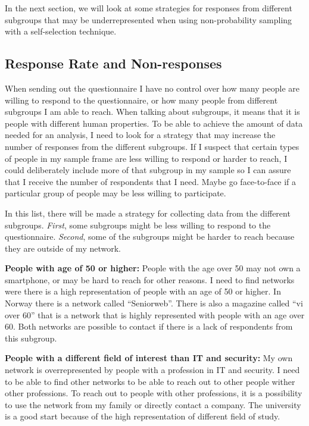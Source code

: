     In the next section, we will look at some strategies for responses from different subgroups that may be underrepresented when using non-probability sampling with a self-selection technique. 

    \subsection{Response Rate and Non-responses} \label{sec:response}

    When sending out the questionnaire I have no control over how many people are willing to respond to the questionnaire, or how many people from different subgroups I am able to reach. When talking about subgroups, it means that it is people with different human properties. To be able to achieve the amount of data needed for an analysis, I need to look for a strategy that may increase the number of responses from the different subgroups. If I suspect that certain types of people in my sample frame are less willing to respond or harder to reach, I could deliberately include more of that subgroup in my sample so I can assure that I receive the number of respondents that I need. Maybe go face-to-face if a particular group of people may be less willing to participate. 

    In this list, there will be made a strategy for collecting data from the different subgroups. {\it First}, some subgroups might be less willing to respond to the questionnaire. {\it Second}, some of the subgroups might be harder to reach because they are outside of my network. 

    {\bf People with age of 50 or higher:} People with the age over 50 may not own a smartphone, or may be hard to reach for other reasons. I need to find networks were there is a high representation of people with an age of 50 or higher. In Norway there is a network called ``Seniorweb''. There is also a magazine called ``vi over 60'' that is a network that is highly represented with people with an age over 60. Both networks are possible to contact if there is a lack of respondents from this subgroup. 

    {\bf People with a different field of interest than IT and security:} My own network is overrepresented by people with a profession in IT and security. I need to be able to find other networks to be able to reach out to other people wither other professions. To reach out to people with other professions, it is a possibility to use the network from my family or directly contact a company. The university is a good start because of the high representation of different field of study. 
    
